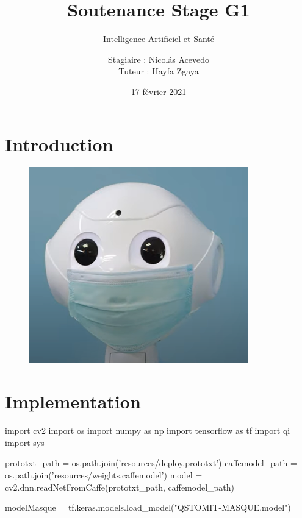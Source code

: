 \documentclass{cubeamer}
\title{Soutenance Stage G1}
\subtitle{Intelligence Artificiel et Santé}
\author[Nicolás Acevedo]{Stagiaire : Nicolás Acevedo \\ Tuteur : Hayfa Zgaya}
\date{17 février 2021} %
\institute[École Centrale de Lille]{}
\newcommand{\tab}{\- \- \- \-}
\begin{document}
\maketitle


\section{Introduction}

\begin{frame}
	\begin{figure}
		\includegraphics[height = 0.7\textheight]{img/peppermask.png}
	\end{figure}
\end{frame}

%
%

\section{Implementation}

\begin{frame}[fragile]
	\begin{semiverbatim}
import cv2
import os
import numpy as np
import tensorflow as tf
import qi
import sys

prototxt_path = os.path.join('resources/deploy.prototxt')
caffemodel_path = os.path.join('resources/weights.caffemodel')
model = cv2.dnn.readNetFromCaffe(prototxt_path, caffemodel_path)

modelMasque = tf.keras.models.load_model("QSTOMIT-MASQUE.model")
	\end{semiverbatim}
	
\end{frame}
\end{document}
